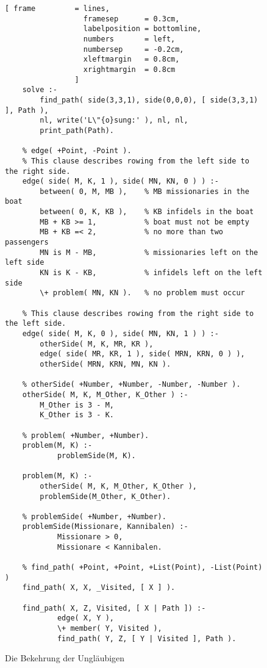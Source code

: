 \begin{figure}[!h]
  \centering
\begin{Verbatim}[ frame         = lines, 
                  framesep      = 0.3cm, 
                  labelposition = bottomline,
                  numbers       = left,
                  numbersep     = -0.2cm,
                  xleftmargin   = 0.8cm,
                  xrightmargin  = 0.8cm
                ]
    solve :-
        find_path( side(3,3,1), side(0,0,0), [ side(3,3,1) ], Path ),
        nl, write('L\"{o}sung:' ), nl, nl,
        print_path(Path).
    
    % edge( +Point, -Point ).    
    % This clause describes rowing from the left side to the right side.
    edge( side( M, K, 1 ), side( MN, KN, 0 ) ) :-
        between( 0, M, MB ),    % MB missionaries in the boat
        between( 0, K, KB ),    % KB infidels in the boat
        MB + KB >= 1,           % boat must not be empty
        MB + KB =< 2,           % no more than two passengers
        MN is M - MB,           % missionaries left on the left side
        KN is K - KB,           % infidels left on the left side
        \+ problem( MN, KN ).   % no problem must occur
    
    % This clause describes rowing from the right side to the left side.
    edge( side( M, K, 0 ), side( MN, KN, 1 ) ) :-
        otherSide( M, K, MR, KR ),
        edge( side( MR, KR, 1 ), side( MRN, KRN, 0 ) ),
        otherSide( MRN, KRN, MN, KN ).
    
    % otherSide( +Number, +Number, -Number, -Number ).
    otherSide( M, K, M_Other, K_Other ) :-
        M_Other is 3 - M,
        K_Other is 3 - K.
    
    % problem( +Number, +Number).
    problem(M, K) :- 
            problemSide(M, K).
    
    problem(M, K) :-
        otherSide( M, K, M_Other, K_Other ),
        problemSide(M_Other, K_Other).
        
    % problemSide( +Number, +Number).
    problemSide(Missionare, Kannibalen) :- 
            Missionare > 0, 
            Missionare < Kannibalen.
    
    % find_path( +Point, +Point, +List(Point), -List(Point) )
    find_path( X, X, _Visited, [ X ] ).
    
    find_path( X, Z, Visited, [ X | Path ]) :-
            edge( X, Y ),
            \+ member( Y, Visited ),
            find_path( Y, Z, [ Y | Visited ], Path ).
\end{Verbatim}
\vspace*{-0.3cm}
  \caption{Die Bekehrung der Ungl\"{a}ubigen}
  \label{fig:missionare.pl}
\end{figure}      


